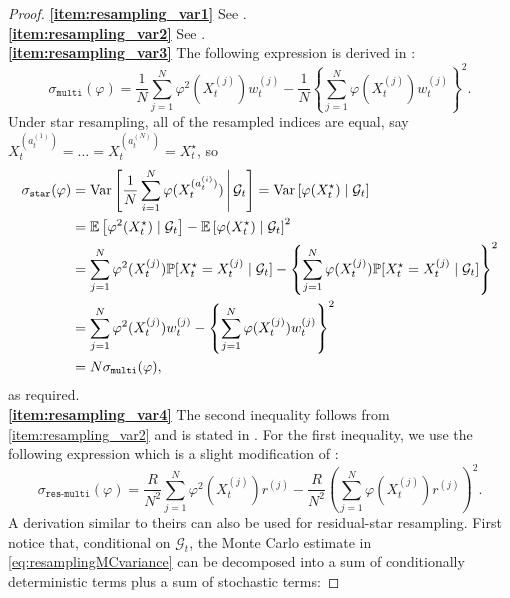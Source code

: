 \begin{proof}
\textbf{\ref{item:resampling_var1}} See \textcite[Section 3]{douc2005}.\\
\textbf{\ref{item:resampling_var2}} See \textcite[Section 3]{douc2005}.\\
\textbf{\ref{item:resampling_var3}}
The following expression is derived in \textcite[Equation (6)]{douc2005}:
\begin{equation*}
\sigma_{\texttt{multi}}(\varphi)
= \frac{1}{N} \sum_{j=1}^N \varphi^2(X_t^{(j)}) w_t^{(j)}
        - \frac{1}{N} \left\{ \sum_{j=1}^N \varphi(X_t^{(j)}) w_t^{(j)} \right\}^2 .
\end{equation*}
Under star resampling, all of the resampled indices are equal, say $X_t^{(a_t^{(1)})} = \dots = X_t^{(a_t^{(N)})} = X_t^\star$, so
\begin{align*}
\sigma_{\texttt{star}}(\varphi)
&= \operatorname{Var}\left[ \frac{1}{N} \sum_{i=1}^N \varphi( X_t^{(a_t^{(i)})} ) \,\middle|\, \mathcal{G}_t \right]
= \operatorname{Var}\left[ \varphi( X_t^\star) \mid \mathcal{G}_t \right] \\
&= \mathbb{E}\left[ \varphi^2( X_t^\star) \mid \mathcal{G}_t \right]
        - \mathbb{E}\left[ \varphi( X_t^\star) \mid \mathcal{G}_t \right]^2 \\
&= \sum_{j=1}^N \varphi^2(X_t^{(j)}) 
        \mathbb{P}[ X_t^\star = X_t^{(j)} \mid \mathcal{G}_t ]
        - \left\{ \sum_{j=1}^N \varphi(X_t^{(j)}) 
        \mathbb{P}[ X_t^\star = X_t^{(j)} \mid \mathcal{G}_t ] \right\}^2 \\
&= \sum_{j=1}^N \varphi^2(X_t^{(j)}) w_t^{(j)}
        - \left\{ \sum_{j=1}^N \varphi(X_t^{(j)}) w_t^{(j)} \right\}^2 \\
&= N \sigma_{\texttt{multi}}(\varphi) ,
\end{align*}
as required.\\
\textbf{\ref{item:resampling_var4}} The second inequality follows from \ref{item:resampling_var2} and is stated in \textcite[p.9]{gerber2017}.
For the first inequality, we use the following expression which is a slight modification of \textcite[Equation (8)]{douc2005}:
\begin{equation*}
\sigma_{\texttt{res-multi}}(\varphi)
= \frac{R}{N^2} \sum_{j=1}^N \varphi^2(X_t^{(j)}) r^{(j)}
        - \frac{R}{N^2} \left( \sum_{j=1}^N \varphi(X_t^{(j)}) r^{(j)} \right)^2 .
\end{equation*}
A derivation similar to theirs can also be used for residual-star resampling. 
First notice that, conditional on $\mathcal{G}_t$, the Monte Carlo estimate in \eqref{eq:resamplingMCvariance} can be decomposed into a sum of conditionally deterministic terms plus a sum of stochastic terms:

\end{proof}
